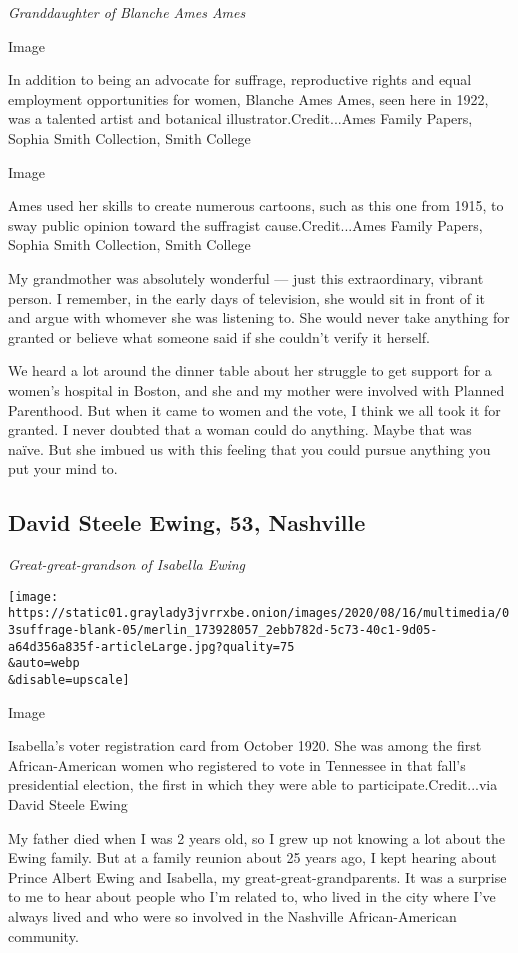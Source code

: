 \emph{Granddaughter of Blanche Ames Ames}

Image

In addition to being an advocate for suffrage, reproductive rights and
equal employment opportunities for women, Blanche Ames Ames, seen here
in 1922, was a talented artist and botanical illustrator.Credit...Ames
Family Papers, Sophia Smith Collection, Smith College

Image

Ames used her skills to create numerous cartoons, such as this one from
1915, to sway public opinion toward the suffragist cause.Credit...Ames
Family Papers, Sophia Smith Collection, Smith College

My grandmother was absolutely wonderful --- just this extraordinary,
vibrant person. I remember, in the early days of television, she would
sit in front of it and argue with whomever she was listening to. She
would never take anything for granted or believe what someone said if
she couldn't verify it herself.

We heard a lot around the dinner table about her struggle to get support
for a women's hospital in Boston, and she and my mother were involved
with Planned Parenthood. But when it came to women and the vote, I think
we all took it for granted. I never doubted that a woman could do
anything. Maybe that was naïve. But she imbued us with this feeling that
you could pursue anything you put your mind to.

\hypertarget{david-steele-ewing-53-nashville}{%
\subsection{David Steele Ewing, 53,
Nashville}\label{david-steele-ewing-53-nashville}}

\emph{Great-great-grandson of Isabella Ewing}

\texttt{[image: https://static01.graylady3jvrrxbe.onion/images/2020/08/16/multimedia/03suffrage-blank-05/merlin\_173928057\_2ebb782d-5c73-40c1-9d05-a64d356a835f-articleLarge.jpg?quality=75\\\&auto=webp\\\&disable=upscale]}

Image

Isabella's voter registration card from October 1920. She was among the
first African-American women who registered to vote in Tennessee in that
fall's presidential election, the first in which they were able to
participate.Credit...via David Steele Ewing

My father died when I was 2 years old, so I grew up not knowing a lot
about the Ewing family. But at a family reunion about 25 years ago, I
kept hearing about Prince Albert Ewing and Isabella, my
great-great-grandparents. It was a surprise to me to hear about people
who I'm related to, who lived in the city where I've always lived and
who were so involved in the Nashville African-American community.


